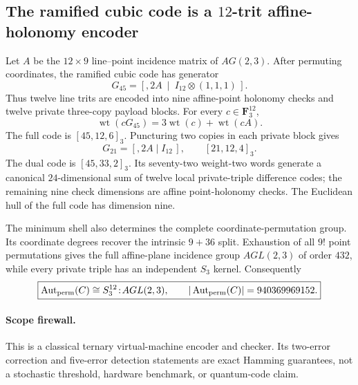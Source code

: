 \subsection*{The ramified cubic code is a $12$-trit affine-holonomy encoder}

Let $A$ be the $12\times9$ line--point incidence matrix of $AG(2,3)$.
After permuting coordinates, the ramified cubic code has generator
\[
\boxed{G_{45}=\left[,2A\ \middle|\
I_{12}\otimes(1,1,1)\,\right]}.
\]
Thus twelve line trits are encoded into nine affine-point holonomy checks and
twelve private three-copy payload blocks.  For every
$c\in\mathbf F_3^{12}$,
\[
 \operatorname{wt}(cG_{45})
 =3\operatorname{wt}(c)+\operatorname{wt}(cA).
\]
The full code is $[45,12,6]_3$.  Puncturing two copies in each private block
gives
\[
G_{21}=[,2A\mid I_{12}\,],\qquad [21,12,4]_3.
\]
The dual code is $[45,33,2]_3$.  Its seventy-two weight-two words generate a
canonical $24$-dimensional sum of twelve local private-triple difference
codes; the remaining nine check dimensions are affine point-holonomy checks.
The Euclidean hull of the full code has dimension nine.

The minimum shell also determines the complete coordinate-permutation group.
Its coordinate degrees recover the intrinsic $9+36$ split.  Exhaustion of all
$9!$ point permutations gives the full affine-plane incidence group
$AGL(2,3)$ of order $432$, while every private triple has an independent
$S_3$ kernel.  Consequently
\[
\boxed{\operatorname{Aut}_{\rm perm}(C)
\cong S_3^{12}\!:\!AGL(2,3),\qquad
|\operatorname{Aut}_{\rm perm}(C)|=940369969152.}
\]

\paragraph{Scope firewall.}
This is a classical ternary virtual-machine encoder and checker.  Its
two-error correction and five-error detection statements are exact Hamming
guarantees, not a stochastic threshold, hardware benchmark, or quantum-code
claim.
